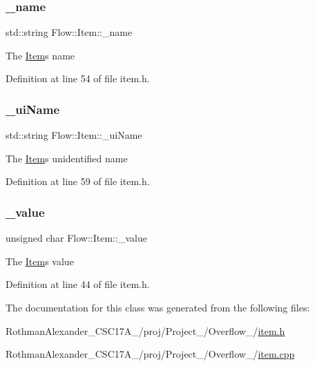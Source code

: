 \hypertarget{class_flow_1_1_item_ac7078c7e7317b504c3f3aa017e2f2907}{}\label{class_flow_1_1_item_ac7078c7e7317b504c3f3aa017e2f2907} 
\subsubsection{\texorpdfstring{\+\_\+name}{\_name}}
{\footnotesize\ttfamily std\+::string Flow\+::\+Item\+::\+\_\+name\hspace{0.3cm}{\ttfamily [protected]}}

The \hyperlink{class_flow_1_1_item}{Item}\textquotesingle{}s name 

Definition at line 54 of file item.\+h.

\hypertarget{class_flow_1_1_item_ae08e5fc92acca2fd0e2b88f9c6d4a750}{}\label{class_flow_1_1_item_ae08e5fc92acca2fd0e2b88f9c6d4a750} 
\subsubsection{\texorpdfstring{\+\_\+ui\+Name}{\_uiName}}
{\footnotesize\ttfamily std\+::string Flow\+::\+Item\+::\+\_\+ui\+Name\hspace{0.3cm}{\ttfamily [protected]}}

The \hyperlink{class_flow_1_1_item}{Item}\textquotesingle{}s unidentified name 

Definition at line 59 of file item.\+h.

\hypertarget{class_flow_1_1_item_a1c1de96ab66fbe77536937564a0852fd}{}\label{class_flow_1_1_item_a1c1de96ab66fbe77536937564a0852fd} 
\subsubsection{\texorpdfstring{\+\_\+value}{\_value}}
{\footnotesize\ttfamily unsigned char Flow\+::\+Item\+::\+\_\+value\hspace{0.3cm}{\ttfamily [protected]}}

The \hyperlink{class_flow_1_1_item}{Item}\textquotesingle{}s value 

Definition at line 44 of file item.\+h.



The documentation for this class was generated from the following files\+:\begin{DoxyCompactItemize}
\item 
Rothman\+Alexander\+\_\+\+C\+S\+C17\+A\+\_/proj/\+Project\+\_/\+Overflow\+\_/\hyperlink{item_8h}{item.\+h}\item 
Rothman\+Alexander\+\_\+\+C\+S\+C17\+A\+\_/proj/\+Project\+\_/\+Overflow\+\_/\hyperlink{item_8cpp}{item.\+cpp}\end{DoxyCompactItemize}
